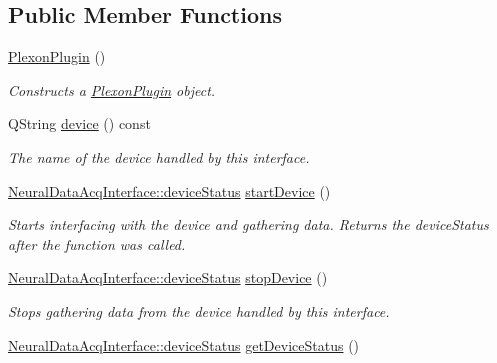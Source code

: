 \subsection*{Public Member Functions}
\begin{DoxyCompactItemize}
\item 
\hypertarget{class_plexon_plugin_a0bd4a49facbf56e4dadeac63ff529031}{\hyperlink{class_plexon_plugin_a0bd4a49facbf56e4dadeac63ff529031}{Plexon\-Plugin} ()}\label{class_plexon_plugin_a0bd4a49facbf56e4dadeac63ff529031}

\begin{DoxyCompactList}\small\item\em Constructs a \hyperlink{class_plexon_plugin}{Plexon\-Plugin} object. \end{DoxyCompactList}\item 
\hypertarget{class_plexon_plugin_aacfab4eb54f0d0bf0690cde1286bf6f4}{Q\-String \hyperlink{class_plexon_plugin_aacfab4eb54f0d0bf0690cde1286bf6f4}{device} () const }\label{class_plexon_plugin_aacfab4eb54f0d0bf0690cde1286bf6f4}

\begin{DoxyCompactList}\small\item\em The name of the device handled by this interface. \end{DoxyCompactList}\item 
\hyperlink{class_neural_data_acq_interface_a18d2ffb89521e40cba91a159e47fd449}{Neural\-Data\-Acq\-Interface\-::device\-Status} \hyperlink{class_plexon_plugin_afa5c5fe29b60abd12760537baf972746}{start\-Device} ()
\begin{DoxyCompactList}\small\item\em Starts interfacing with the device and gathering data. Returns the device\-Status after the function was called. \end{DoxyCompactList}\item 
\hypertarget{class_plexon_plugin_a10dff80ebaac37e06c53a9d9a664603e}{\hyperlink{class_neural_data_acq_interface_a18d2ffb89521e40cba91a159e47fd449}{Neural\-Data\-Acq\-Interface\-::device\-Status} \hyperlink{class_plexon_plugin_a10dff80ebaac37e06c53a9d9a664603e}{stop\-Device} ()}\label{class_plexon_plugin_a10dff80ebaac37e06c53a9d9a664603e}

\begin{DoxyCompactList}\small\item\em Stops gathering data from the device handled by this interface. \end{DoxyCompactList}\item 
\hypertarget{class_plexon_plugin_a23d55293fb6964484892bc9eddf58dd1}{\hyperlink{class_neural_data_acq_interface_a18d2ffb89521e40cba91a159e47fd449}{Neural\-Data\-Acq\-Interface\-::device\-Status} \hyperlink{class_plexon_plugin_a23d55293fb6964484892bc9eddf58dd1}{get\-Device\-Status} ()}\label{class_plexon_plugin_a23d55293fb6964484892bc9eddf58dd1}


\end{DoxyCompactItemize}
